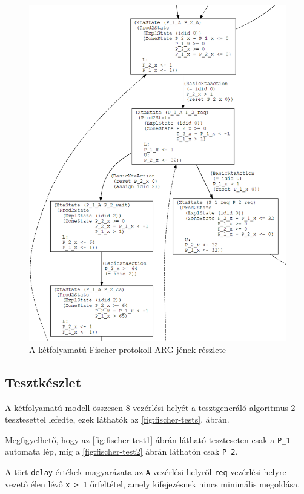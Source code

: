 \begin{figure}%
    \centering
    \includegraphics[width=\textwidth, keepaspectratio]{src/figures/fischer-arg-reszlet.png}
    \caption{A kétfolyamatú Fischer-protokoll ARG-jének részlete}
    \label{fig:fischer-arg-reszlet}
\end{figure}

\subsection{Tesztkészlet}

A kétfolyamatú modell összesen 8 vezérlési helyét a tesztgeneráló algoritmus 2 tesztesettel lefedte, ezek láthatók az \ref{fig:fischer-tests}. ábrán.

Megfigyelhető, hogy az \ref{fig:fischer-test1} ábrán látható teszteseten csak a \texttt{P\_1} automata lép, míg a \ref{fig:fischer-test2} ábrán láthatón csak \texttt{P\_2}.

A tört \texttt{delay} értékek magyarázata az \texttt{A} vezérlési helyről \texttt{req} vezérlési helyre vezető élen lévő \texttt{x > 1} őrfeltétel, amely kifejezésnek nincs minimális megoldása.

